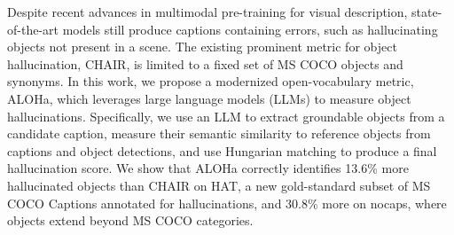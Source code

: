 Despite recent advances in multimodal pre-training for visual description, state-of-the-art models still produce captions containing errors, such as hallucinating objects not present in a scene. The existing prominent metric for object hallucination, CHAIR, is limited to a fixed set of MS COCO objects and synonyms. In this work, we propose a modernized open-vocabulary metric, ALOHa, which leverages large language models (LLMs) to measure object hallucinations. Specifically, we use an LLM to extract groundable objects from a candidate caption, measure their semantic similarity to reference objects from captions and object detections, and use Hungarian matching to produce a final hallucination score. We show that ALOHa correctly identifies 13.6\% more hallucinated objects than CHAIR on HAT, a new gold-standard subset of MS COCO Captions annotated for hallucinations, and 30.8\% more on nocaps, where objects extend beyond MS COCO categories.